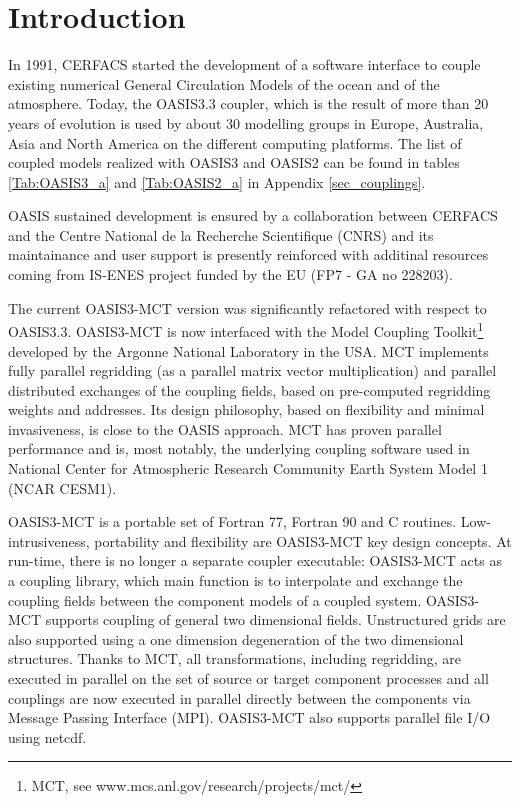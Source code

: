 \newpage
\chapter{Introduction}
\label{sec_step}

In 1991, CERFACS started the development of
a software interface to couple existing numerical General
Circulation Models of the ocean and of the atmosphere. Today, the
OASIS3.3 coupler, which is the result of more than 20 years of evolution
is used by about 30 modelling groups in Europe, Australia, Asia and
North America on the different computing platforms. The list of
coupled models realized with OASIS3  and OASIS2 can be
found in tables \ref{Tab:OASIS3_a} and \ref{Tab:OASIS2_a} in Appendix \ref{sec_couplings}.

OASIS sustained development is ensured by a collaboration
between CERFACS and the Centre National de la Recherche Scientifique
(CNRS) and its maintainance and user support is presently reinforced
with additinal resources coming from IS-ENES project funded by the EU (FP7 -
GA no 228203).

The current OASIS3-MCT version was significantly refactored with respect to OASIS3.3. OASIS3-MCT is now interfaced with the Model
Coupling Toolkit\footnote{MCT, see www.mcs.anl.gov/research/projects/mct/} \citet{mct_larson} \citet{mct_jacob} developed by the Argonne National Laboratory in the USA. MCT implements fully parallel regridding (as a parallel matrix vector 
multiplication) and parallel distributed exchanges of the coupling
fields, based on pre-computed regridding weights and addresses. 
Its design philosophy, based on flexibility and minimal invasiveness,
is close to the OASIS approach. 
MCT has proven parallel performance and is, most notably, the
underlying coupling software used in National Center for Atmospheric
Research Community Earth System Model 1 (NCAR CESM1).

OASIS3-MCT is a portable set of Fortran 77, Fortran 90 and C routines. Low-intrusiveness, portability and flexibility are OASIS3-MCT key design concepts. At run-time, there is no
longer a separate coupler executable: OASIS3-MCT acts as a coupling library, which main function is to interpolate and exchange the coupling fields between the component models of a coupled system.  OASIS3-MCT supports  coupling of general two dimensional fields.  Unstructured grids are also supported using a one dimension degeneration of the two dimensional structures. Thanks to MCT, all transformations, including regridding, are executed in parallel on the set of source or target component processes and all couplings are now executed in parallel directly between the components via Message Passing Interface
(MPI). OASIS3-MCT also supports parallel file I/O using netcdf.  

